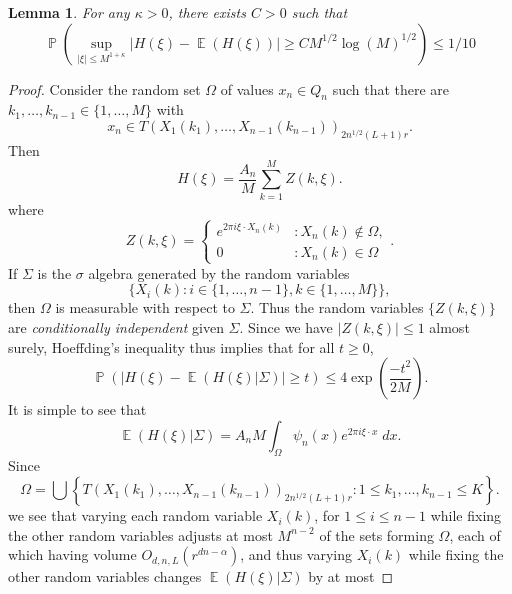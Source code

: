 \documentclass[dvipsnames,letterpaper,12pt]{article}
\numberwithin{equation}{section}
\newtheorem{lemma}[theorem]{Lemma}
\numberwithin{theorem}{section}
\DeclareMathOperator{\EE}{\mathbb{E}}
\DeclareMathOperator{\PP}{\mathbb{P}}
\begin{document}
\begin{lemma} \label{lastconcentrationbound}
    For any $\kappa > 0$, there exists $C > 0$ such that
    \[ \PP \left( \sup_{|\xi| \leq M^{1 + \kappa}} | H(\xi) - \EE(H(\xi)) | \geq C M^{1/2} \log(M)^{1/2} \right) \leq 1/10 \]
\end{lemma}
\begin{proof}
    Consider the random set $\Omega$ of values $x_n \in Q_n$ such that there are $k_1,\dots,k_{n-1} \in \{ 1,\dots,M \}$ with
    \begin{equation}
        x_n \in T(X_1(k_1),\dots,X_{n-1}(k_{n-1}))_{2 n^{1/2} (L+1) r}.
    \end{equation}
    Then
    \begin{equation}
        H(\xi) = \frac{A_n}{M} \sum_{k = 1}^M Z(k,\xi).
    \end{equation}
    where
    \[ Z(k,\xi) = \begin{cases} e^{2 \pi i \xi \cdot X_n(k)} &: X_n(k) \not \in \Omega, \\ 0 &: X_n(k) \in \Omega \end{cases}. \]
    If $\Sigma$ is the $\sigma$ algebra generated by the random variables
    \[ \{ X_i(k) : i \in \{ 1, \dots, n-1 \}, k \in \{ 1, \dots, M \} \}, \]
    then $\Omega$ is measurable with respect to $\Sigma$. Thus the random variables $\{ Z(k,\xi) \}$ are \emph{conditionally independent} given $\Sigma$. Since we have $|Z(k,\xi)| \leq 1$ almost surely, Hoeffding's inequality thus implies that for all $t \geq 0$,
    \begin{equation} \label{equationCOIJCOIJX1232312ssss}
        \PP \left( \left| H(\xi) - \EE(H(\xi)|\Sigma) \right| \geq t \right) \leq 4 \exp \left( \frac{-t^2}{2M} \right).
    \end{equation}
    It is simple to see that
    \begin{equation}
        \EE(H(\xi) | \Sigma) = A_n M \int_\Omega \psi_n(x) e^{2 \pi i \xi \cdot x}\; dx.
    \end{equation}
    Since
    \begin{equation}
        \Omega = \bigcup \left\{ T(X_1(k_1),\dots,X_{n-1}(k_{n-1}))_{2 n^{1/2} (L+1) r} : 1 \leq k_1,\dots,k_{n-1} \leq K \right\}.
    \end{equation}
    we see that varying each random variable $X_i(k)$, for $1 \leq i \leq n-1$ while fixing the other random variables adjusts at most $M^{n-2}$ of the sets forming $\Omega$, each of which having volume $O_{d,n,L}(r^{dn - \alpha})$, and thus varying $X_i(k)$ while fixing the other random variables changes $\EE(H(\xi)|\Sigma)$ by at most

\end{proof}
\end{document}
